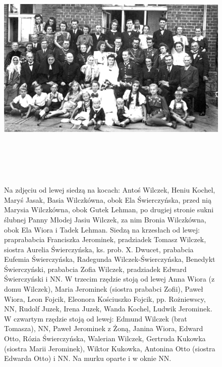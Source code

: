 \begin{figure}
\begin{center}
\includegraphics[height=120mm]{photo/benedykt_radegunda_swierczynscy_slub_2.jpg}
\caption[Ślub Radegundy i Benedykta Świerczyńskich - zdjęcie zbiorowe]{Na zdjęciu od lewej siedzą na kocach: Antoś Wilczek, Heniu Kochel, Maryś Jasak, Basia Wilczkówna, obok Ela Świerczyńska, przed nią Marysia Wilczkówna, obok Gutek Lehman, po drugiej stronie sukni ślubnej Panny Młodej Jasiu Wilczek, za nim Bronia Wilczkówna, obok Ela Wiora i Tadek Lehman. Siedzą na krzesłach od lewej: praprababcia Franciszka Jerominek, pradziadek Tomasz Wilczek, siostra Aurelia Świerczyńska, ks. prob. X. Dwucet, prababcia Eufemia Świerczyńska, Radegunda Wilczek-Świerczyńska, Benedykt Świerczyński, prababcia Zofia Wilczek, pradziadek Edward Świerczyński i NN. W trzecim rzędzie stoją od lewej Anna Wiora (z domu Wilczek), Maria Jerominek (siostra prababci Zofii), Paweł Wiora, Leon Fojcik, Eleonora Kościuszko Fojcik, pp. Rożniewscy, NN, Rudolf Juzek, Irena Juzek, Wanda Kochel, Ludwik Jerominek. W czwartym rzędzie stoją od lewej: Edmund Wilczek (brat Tomasza), NN, Paweł Jerominek z Żoną, Janina Wiora, Edward Otto, Rózia Świerczyńska, Walerian Wilczek, Gertruda Kukowka (siostra Marii Jerominek), Wiktor Kukowka, Antonina Otto (siostra Edwarda Otto) i NN. Na murku oparte i w oknie NN.}
\end{center}
\end{figure}

